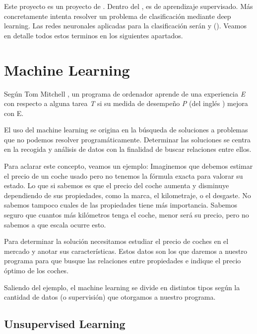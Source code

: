 

Este proyecto es un proyecto de . Dentro del , es de aprendizaje supervisado. Más concretamente intenta resolver un problema de clasificación mediante deep learning. Las redes neuronales aplicadas para la clasificación serán  y  (). Veamos en detalle todos estos terminos en los siguientes apartados.

\section{Machine Learning}

Según Tom Mitchell \cite{mitchell1997machine}, un programa de ordenador aprende de una experiencia \textit{E} con respecto a alguna tarea \textit{T} si su medida de desempeño \textit{P} (del inglés ) mejora con E.

El uso del machine learning se origina en la búsqueda de soluciones a problemas que no podemos resolver programáticamente. Determinar las soluciones se centra en la recogida y análisis de datos con la finalidad de buscar relaciones entre ellos.

Para aclarar este concepto, veamos un ejemplo:
Imaginemos que debemos estimar el precio de un coche usado pero no tenemos la fórmula exacta para valorar su estado. Lo que si sabemos es que el precio del coche aumenta y disminuye dependiendo de sus propiedades, como la marca, el kilometraje, o el desgaste. No sabemos tampoco cuales de las propiedades tiene más importancia. Sabemos seguro que cuantos más kilómetros tenga el coche, menor será su precio, pero no sabemos a que escala ocurre esto.

Para determinar la solución necesitamos estudiar el precio de coches en el mercado y anotar sus características. Estos datos son los que daremos a nuestro programa para que busque las relaciones entre propiedades e indique el precio óptimo de los coches.

Saliendo del ejemplo, el machine learning se divide en distintos tipos según la cantidad de datos (o supervisión) que otorgamos a nuestro programa.

\subsection{Unsupervised Learning}

